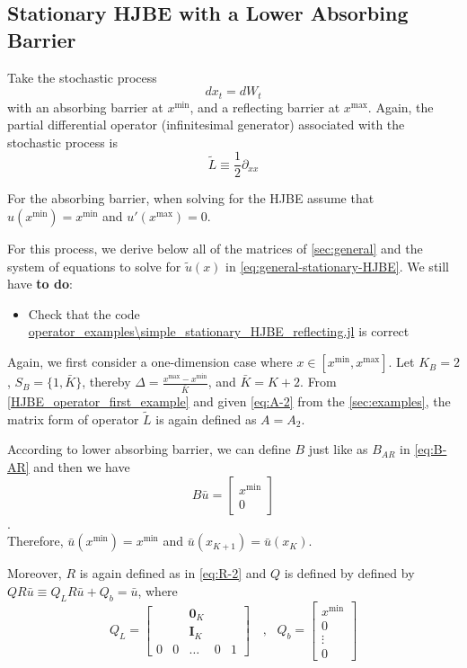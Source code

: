\documentclass[11pt]{article}
\newcommand{\D}[1][]{\ensuremath{\partial_{#1}}}
\begin{document}
\subsection{Stationary HJBE with a Lower Absorbing Barrier}
Take the stochastic process
$$
d x_t = d W_t
$$
with an absorbing barrier at $x^{\min}$, and a reflecting barrier at $x^{\max}$. Again, the partial differential operator (infinitesimal generator) associated with the stochastic process is
$$
\tilde{L} \equiv \frac{1}{2}\D[xx]
$$

For the absorbing barrier, when solving for the HJBE assume that $u(x^{\min}) = x^{\min}$ and $u'(x^{\max}) = 0$.

For this process, we derive below all of the matrices of \cref{sec:general} and the system of equations to solve for $\tilde{u}(x)$ in \cref{eq:general-stationary-HJBE}. We still have \textbf{to do}:
\begin{itemize}
	\item Check that the code \url{operator_examples\simple_stationary_HJBE_reflecting.jl} is correct
\end{itemize}

Again, we first consider a one-dimension case where $x\in [x^{\min},x^{\max}]$. Let $K_B = 2$, $S_B = \{1,\bar{K}\}$, thereby $\Delta  = \frac{x^{\max}-x^{\min}}{\bar{K}}$, and $\bar{K} = K+2$. From \eqref{HJBE_operator_first_example} and given \eqref{eq:A-2} from the \cref{sec:examples}, the matrix form of operator $\tilde{L}$ is again defined as $A = A_2$.

According to lower absorbing barrier, we can define $B$ just like as $B_{AR}$ in \eqref{eq:B-AR} and then we have
\begin{equation}
B\bar{u} = \begin{bmatrix}
x^{\min}\\
0
\end{bmatrix}
\end{equation}.\\
Therefore, $\bar{u}(x^{\min}) = x^{\min}$ and $\bar{u}(x_{K+1}) = \bar{u}(x_K)$.

Moreover, $R$ is again defined as in \eqref{eq:R-2} and $Q$ is defined by defined by $Q R\bar{u}\equiv Q_L R\bar{u}+Q_b = \bar{u}$, where
\begin{equation}
Q_L = \begin{bmatrix}
& & \mathbf{0}_K & & \\
& & \mathbf{I}_K & & \\
0&0&\dots&0&1
\end{bmatrix}%
\quad, \text{ } Q_b = \begin{bmatrix}
x^{\min}\\
0\\
\vdots\\
0
\end{bmatrix}%
\end{equation}
\end{document}
